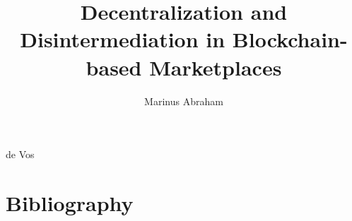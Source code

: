 \documentclass{dissertation}
\begin{document}
\title{Decentralization and Disintermediation in Blockchain-based Marketplaces}
\author{Marinus Abraham}{de Vos}

\frontmatter




\tableofcontents




\mainmatter

\thumbtrue








%
%




%

\thumbfalse

\chapter*{Bibliography}









%
\end{document}
